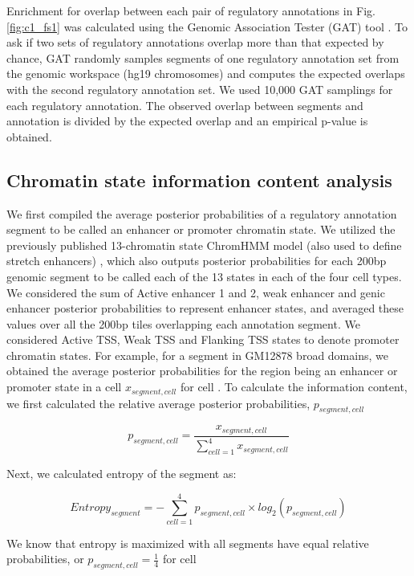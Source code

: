 Enrichment for overlap between each pair of regulatory annotations in Fig. \ref{fig:c1_fs1} was calculated using the Genomic Association Tester (GAT) tool \cite{hegerGATSimulationFramework2013}. To ask if two sets of regulatory annotations overlap more than that expected by chance, GAT randomly samples segments of one regulatory annotation set from the genomic workspace (hg19 chromosomes) and computes the expected overlaps with the second regulatory annotation set. We used 10,000 GAT samplings for each regulatory annotation. The observed overlap between segments and annotation is divided by the expected overlap and an empirical p-value is obtained.

\subsection{Chromatin state information content analysis}
We first compiled the average posterior probabilities of a regulatory annotation segment to be called an enhancer or promoter chromatin state. We utilized the previously published 13-chromatin state ChromHMM model (also used to define stretch enhancers) \cite{varshneyGeneticRegulatorySignatures2017}, which also outputs posterior probabilities for each 200bp genomic segment to be called each of the 13 states in each of the four cell types. We considered the sum of Active enhancer 1 and 2, weak enhancer and genic enhancer posterior probabilities to represent enhancer states, and averaged these values over all the 200bp tiles overlapping each annotation segment. We considered Active TSS, Weak TSS and Flanking TSS states to denote promoter chromatin states. For example, for a segment in GM12878 broad domains, we obtained the average posterior probabilities for the region being an enhancer or promoter state in a cell \(x_{segment, cell}\) for cell . To calculate the information content, we first calculated the relative average posterior probabilities, \(p_{segment, cell}\)

\[ p_{segment, cell} = \frac{x_{segment, cell}} { \sum_{cell=1}^{4}x_{segment, cell}} \]

Next, we calculated entropy of the segment as:

\[ Entropy_{segment}= -\sum_{cell=1}^{4}p_{segment, cell} \times log_2(p_{segment, cell}) \]

We know that entropy is maximized with all segments have equal relative probabilities, or \( p_{segment, cell} = \frac{1}{4} \) for cell 

